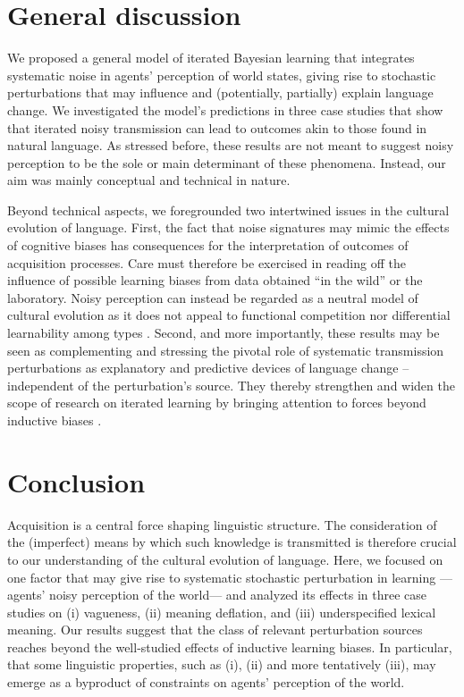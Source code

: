 \documentclass[10pt,a4paper]{article}
\begin{document}
\section{General discussion}
We proposed a general model of iterated Bayesian learning that integrates systematic noise in agents'
perception of world states, giving rise to stochastic perturbations that may influence and
(potentially, partially) explain language change. We investigated the model's predictions in
three case studies that show that iterated noisy transmission can lead to outcomes akin to
those found in natural language. As stressed before, these results are not meant to suggest
noisy perception to be the sole or main determinant of these phenomena. Instead, our aim was
mainly conceptual and technical in nature.

Beyond technical aspects, we foregrounded two intertwined issues in the cultural evolution of
language. First, the fact that noise signatures may mimic the effects of cognitive biases has
consequences for the interpretation of outcomes of acquisition processes. Care must
therefore be exercised in reading off the influence of possible learning biases from
data obtained ``in the wild'' or the laboratory. Noisy perception can instead be regarded as a neutral
model of cultural evolution as it does not appeal to functional
competition nor differential learnability among types \citep{reali+griffiths:2009}. Second, and more importantly, these results
may be seen as complementing and stressing the pivotal role of systematic transmission
perturbations as explanatory and predictive devices of language change -- independent of the
perturbation's source. They thereby strengthen and widen the scope of research on iterated
learning by bringing attention to forces beyond inductive biases \citep[cf.][]{perfors+navarro:2014}.


\section{Conclusion}
Acquisition is a central force shaping linguistic structure. The consideration of the
(imperfect) means by which such knowledge is transmitted is therefore crucial to our
understanding of the cultural evolution of language. Here, we focused on one factor that may
give rise to systematic stochastic perturbation in learning ---agents' noisy perception of the
world--- and analyzed its effects in three case studies on (i) vagueness, (ii) meaning
deflation, and (iii) underspecified lexical meaning. Our results suggest that the class of
relevant perturbation sources reaches beyond the well-studied effects of inductive learning
biases. In particular, that some linguistic properties, such as (i), (ii) and more tentatively
(iii), may emerge as a byproduct of constraints on agents' perception of the world.
\end{document}
